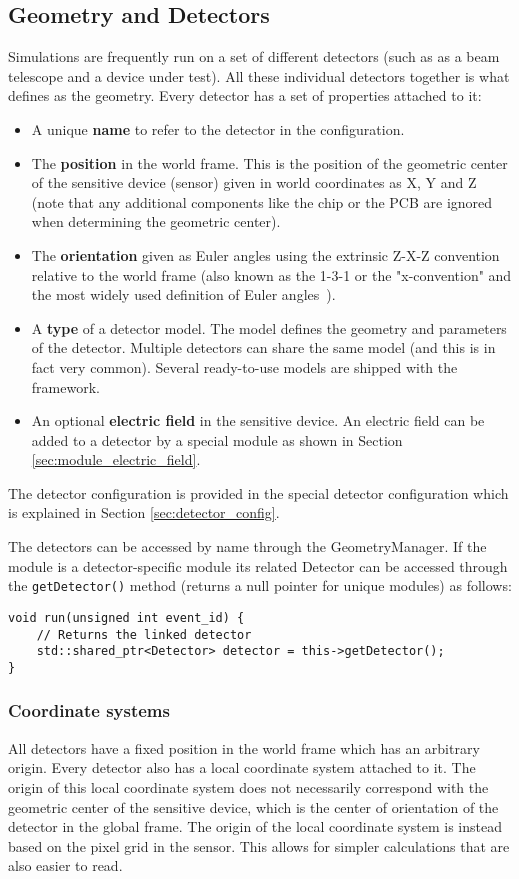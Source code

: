 \subsection{Geometry and Detectors}
\label{sec:models_geometry}
Simulations are frequently run on a set of different detectors (such as as a beam telescope and a device under test). All these individual detectors together is what \apsq defines as the geometry. Every detector has a set of properties attached to it:
\begin{itemize}
\item A unique \textbf{name} to refer to the detector in the configuration.
\item The \textbf{position} in the world frame. This is the position of the geometric center of the sensitive device (sensor) given in world coordinates as X, Y and Z (note that any additional components like the chip or the PCB are ignored when determining the geometric center).
\item The \textbf{orientation} given as Euler angles using the extrinsic Z-X-Z convention relative to the world frame (also known as the 1-3-1 or the "x-convention" and the most widely used definition of Euler angles~\cite{eulerangles}). 
\item A \textbf{type} of a detector model. The model defines the geometry and parameters of the detector. Multiple detectors can share the same model (and this is in fact very common). Several ready-to-use models are shipped with the framework.
\item An optional \textbf{electric field} in the sensitive device. An electric field can be added to a detector by a special module as shown in Section \ref{sec:module_electric_field}.
\end{itemize}
The detector configuration is provided in the special detector configuration which is explained in Section \ref{sec:detector_config}.

The detectors can be accessed by name through the GeometryManager. If the module is a detector-specific module its related Detector can be accessed through the \texttt{getDetector()} method (returns a null pointer for unique modules) as follows:
\begin{verbatim}
void run(unsigned int event_id) {
    // Returns the linked detector
    std::shared_ptr<Detector> detector = this->getDetector();
}
\end{verbatim}

\subsubsection{Coordinate systems}
All detectors have a fixed position in the world frame which has an arbitrary origin. Every detector also has a local coordinate system attached to it. The origin of this local coordinate system does not necessarily correspond with the geometric center of the sensitive device, which is the center of orientation of the detector in the global frame. The origin of the local coordinate system is instead based on the pixel grid in the sensor. This allows for simpler calculations that are also easier to read. 

